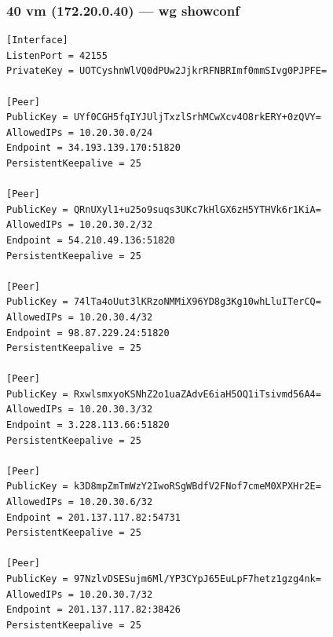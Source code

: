 \documentclass[11pt,a4paper]{article}
\begin{document}
\subsubsection*{40 vm (172.20.0.40) — wg showconf}
\begin{lstlisting}
[Interface]
ListenPort = 42155
PrivateKey = UOTCyshnWlVQ0dPUw2JjkrRFNBRImf0mmSIvg0PJPFE=

[Peer]
PublicKey = UYf0CGH5fqIYJUljTxzlSrhMCwXcv4O8rkERY+0zQVY=
AllowedIPs = 10.20.30.0/24
Endpoint = 34.193.139.170:51820
PersistentKeepalive = 25

[Peer]
PublicKey = QRnUXyl1+u25o9suqs3UKc7kHlGX6zH5YTHVk6r1KiA=
AllowedIPs = 10.20.30.2/32
Endpoint = 54.210.49.136:51820
PersistentKeepalive = 25

[Peer]
PublicKey = 74lTa4oUut3lKRzoNMMiX96YD8g3Kg10whLluITerCQ=
AllowedIPs = 10.20.30.4/32
Endpoint = 98.87.229.24:51820
PersistentKeepalive = 25

[Peer]
PublicKey = RxwlsmxyoKSNhZ2o1uaZAdvE6iaH5OQ1iTsivmd56A4=
AllowedIPs = 10.20.30.3/32
Endpoint = 3.228.113.66:51820
PersistentKeepalive = 25

[Peer]
PublicKey = k3D8mpZmTmWzY2IwoRSgWBdfV2FNof7cmeM0XPXHr2E=
AllowedIPs = 10.20.30.6/32
Endpoint = 201.137.117.82:54731
PersistentKeepalive = 25

[Peer]
PublicKey = 97NzlvDSESujm6Ml/YP3CYpJ65EuLpF7hetz1gzg4nk=
AllowedIPs = 10.20.30.7/32
Endpoint = 201.137.117.82:38426
PersistentKeepalive = 25

\end{lstlisting}
\end{document}
